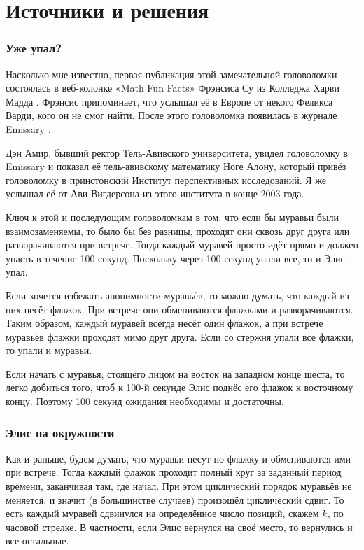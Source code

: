 \section*{Источники и решения}

\subsubsection*{Уже упал?}

Насколько мне известно, первая публикация этой замечательной головоломки состоялась в веб-колонке «Math Fun Facts» Фрэнсиса Су из Колледжа Харви Мадда \cite{math-fun-facts}.
Фрэнсис припоминает, что услышал её в Европе от некого Феликса Варди, кого он не смог найти.
После этого головоломка появилась в журнале Emissary \cite[Весна/Осень 2003]{3}.

Дэн Амир, бывший ректор Тель-Авивского университета, увидел головоломку в Emissary и показал её тель-авивскому математику Ноге Алону, который привёз головоломку в принстонский Институт перспективных исследований.
Я же услышал её от Ави Вигдерсона из этого института в конце 2003 года.

Ключ к этой и последующим головоломкам в том, что если бы муравьи были взаимозаменяемы, то было бы без разницы, проходят они сквозь друг друга или разворачиваются при встрече.
Тогда каждый муравей просто идёт прямо и должен упасть в течение 100 секунд.
Поскольку через 100 секунд упали все, то и Элис упал.

Если хочется избежать анонимности муравьёв, то можно думать, что каждый из них несёт флажок.
При встрече они обмениваются флажками и разворачиваются.
Таким образом, каждый муравей всегда несёт один флажок, а при встрече муравьёв флажки проходят мимо друг друга.
Если со стержня упали все флажки, то упали и муравьи.

Если начать с муравья, стоящего лицом на восток на западном конце шеста, то легко добиться того, чтоб к 100-й секунде Элис поднёс его флажок к восточному концу.
Поэтому 100 секунд ожидания необходимы и достаточны.

\subsubsection*{Элис на окружности}

Как и раньше, будем думать, что муравьи несут по флажку и обмениваются ими при встрече.
Тогда каждый флажок проходит полный круг за заданный период времени, заканчивая там, где начал.
При этом циклический порядок муравьёв не меняется, и значит (в большинстве случаев) произошёл циклический сдвиг.
То есть каждый муравей сдвинулся на определённое число позиций, скажем $k$, по часовой стрелке.
В частности, если Элис вернулся на своё место, то вернулись и все остальные.

